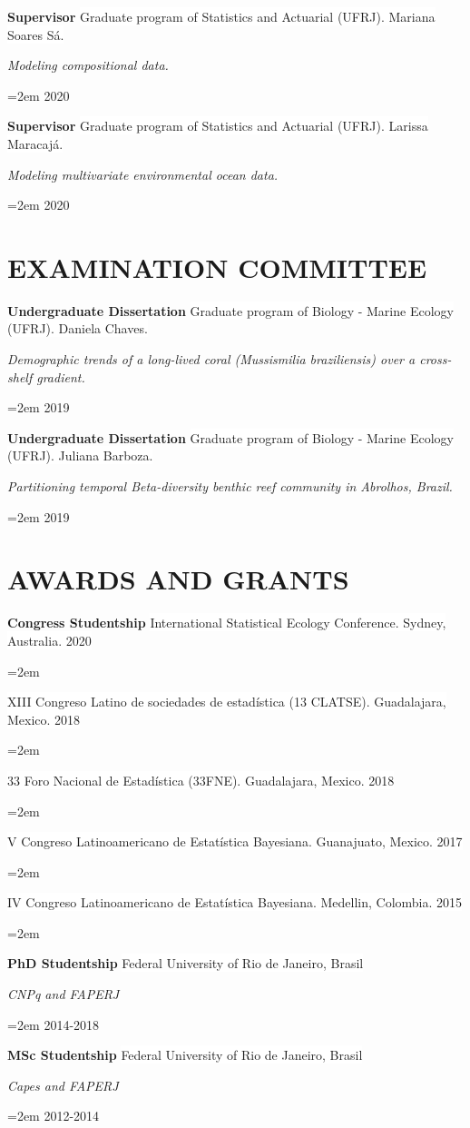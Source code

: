 \documentclass[paper=a4,fontsize=11pt]{scrartcl}	 			%
\newcommand{\sepspace}{\vspace*{1em}}			%
\newcommand{\NewPart}[1]{\section*{\uppercase{#1}}}
\newcommand{\EducationEntry}[4]{
		\noindent \textbf{#1} \hfill 					%
		\colorbox{White}{%
			\parbox{10em}{%
			\hfill\color{Black}#2}} \par				%
		\noindent \textit{#3} \par					%
		\noindent\hangindent=2em\hangafter=0 \small #4 	%
		\normalsize \par}
\newcommand{\WorkEntry}[4]{						%
		\noindent \textbf{#1} \hfill 					%
		\colorbox{White}{\color{Black}#2} \par		%
		\noindent \textit{#3} \par					%
		\noindent\hangindent=2em\hangafter=0 \small #4 	%
		\normalsize \par}
\begin{document}
\WorkEntry{Supervisor}{Graduate  program of Statistics and Actuarial (UFRJ). Mariana Soares Sá.}{Modeling compositional data.}{2020}
\sepspace

\WorkEntry{Supervisor}{Graduate  program of Statistics and Actuarial (UFRJ). Larissa Maracajá.}{Modeling multivariate environmental ocean data.}{2020}
\sepspace



\NewPart{Examination Committee}{}

\WorkEntry{Undergraduate Dissertation}{Graduate  program of Biology - Marine Ecology (UFRJ). Daniela Chaves.}{Demographic trends of a long-lived coral (Mussismilia braziliensis) over a cross-shelf gradient.}{2019}
\sepspace

\WorkEntry{Undergraduate Dissertation}{Graduate  program of Biology - Marine Ecology (UFRJ). Juliana Barboza.}{Partitioning temporal Beta-diversity benthic reef community in Abrolhos, Brazil.}{2019}
\sepspace


\NewPart{Awards and Grants}{}

%
%

\WorkEntry{Congress Studentship}{International Statistical Ecology Conference. Sydney, Australia. 2020 }{}{}

\WorkEntry{}{XIII Congreso Latino de sociedades de estadística (13 CLATSE). Guadalajara, Mexico.  2018}{}{}

\WorkEntry{}{33 Foro Nacional de Estadística (33FNE). Guadalajara, Mexico. 2018}{}{}

\WorkEntry{}{V Congreso Latinoamericano de Estatística Bayesiana. Guanajuato, Mexico. 2017}{}{}

\WorkEntry{}{IV Congreso Latinoamericano de Estatística Bayesiana. Medellin, Colombia. 2015}{}{}






\WorkEntry{PhD Studentship}{Federal University of Rio de Janeiro, Brasil}{CNPq and FAPERJ}{2014-2018}
\sepspace

\WorkEntry{MSc Studentship}{Federal University of Rio de Janeiro, Brasil}{Capes and FAPERJ }{2012-2014}
\sepspace
\end{document}
